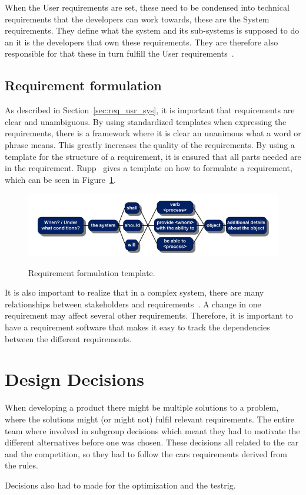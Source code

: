 When the User requirements are set, these need to be condensed into technical
requirements that the developers can work towards, these are the System
requirements. They define what the system and its sub-systems is supposed to do
an it is the developers that own these requirements. They are therefore also
responsible for that these in turn fulfill the User requirements~\cite{ibm_req}.

\subsection{Requirement formulation}
As described in Section~\ref{sec:req_usr_sys}, it is important that requirements
are clear and unambiguous. By using standardized templates when expressing the
requirements, there is a framework where it is clear an unanimous what a word or
phrase means.  This greatly increases the quality of the
requirements\cite{rupp2014}.  By using a template for the structure of a
requirement, it is ensured that all parts needed are in the requirement.
Rupp~\cite{rupp2014} gives a template on how to formulate a
requirement, which can be seen in Figure~\ref{fig:req_template}.
\begin{figure}[H]
    \centering\label{fig:req_template}
    \includegraphics[width=\textwidth]{./img/introduction_req_template.PNG}
    \caption{Requirement formulation template.}
\end{figure}
It is also important to realize that in a complex system, there are many
relationships between stakeholders and requirements~\cite{ibm_req}. A change in
one requirement may affect several other requirements. Therefore, it is
important to have a requirement software that makes it easy to track the
dependencies between the different requirements.


\section{Design Decisions}
When developing a product there might be multiple solutions to a problem, 
where the solutions might (or might not) fulfil relevant requirements. 
The entire team where involved in subgroup decisions which meant they had to motivate
the different alternatives before one was chosen. These decisions all related to the 
car and the competition, so they had to follow the cars requirements derived from the rules.

Decisions also had to made for the optimization and the testrig.